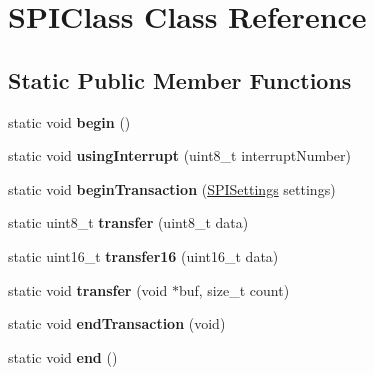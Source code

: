 \hypertarget{class_s_p_i_class}{}\section{S\+P\+I\+Class Class Reference}
\label{class_s_p_i_class}
\subsection*{Static Public Member Functions}
\begin{DoxyCompactItemize}
\item 
\hypertarget{class_s_p_i_class_a4a2646959a242f6af423b04734c003f0}{}static void {\bfseries begin} ()\label{class_s_p_i_class_a4a2646959a242f6af423b04734c003f0}

\item 
\hypertarget{class_s_p_i_class_a1f21d6f84d89334bf1a897ec116860b4}{}static void {\bfseries using\+Interrupt} (uint8\+\_\+t interrupt\+Number)\label{class_s_p_i_class_a1f21d6f84d89334bf1a897ec116860b4}

\item 
\hypertarget{class_s_p_i_class_ae1cf818a1add8237a1f6ead0cb20943a}{}static void {\bfseries begin\+Transaction} (\hyperlink{class_s_p_i_settings}{S\+P\+I\+Settings} settings)\label{class_s_p_i_class_ae1cf818a1add8237a1f6ead0cb20943a}

\item 
\hypertarget{class_s_p_i_class_a4f716aa6f751ca1e6213c7229a3b2a73}{}static uint8\+\_\+t {\bfseries transfer} (uint8\+\_\+t data)\label{class_s_p_i_class_a4f716aa6f751ca1e6213c7229a3b2a73}

\item 
\hypertarget{class_s_p_i_class_addd97e6ac969a2a45252be988e81e717}{}static uint16\+\_\+t {\bfseries transfer16} (uint16\+\_\+t data)\label{class_s_p_i_class_addd97e6ac969a2a45252be988e81e717}

\item 
\hypertarget{class_s_p_i_class_a32756da6a1149ceb787abeea4edc7b1f}{}static void {\bfseries transfer} (void $\ast$buf, size\+\_\+t count)\label{class_s_p_i_class_a32756da6a1149ceb787abeea4edc7b1f}

\item 
\hypertarget{class_s_p_i_class_a99054797d8478c8fe0cdee943e00614e}{}static void {\bfseries end\+Transaction} (void)\label{class_s_p_i_class_a99054797d8478c8fe0cdee943e00614e}

\item 
\hypertarget{class_s_p_i_class_a79d89d8e3f5f1b003cb7b0aed2d77eab}{}static void {\bfseries end} ()\label{class_s_p_i_class_a79d89d8e3f5f1b003cb7b0aed2d77eab}


\end{DoxyCompactItemize}

